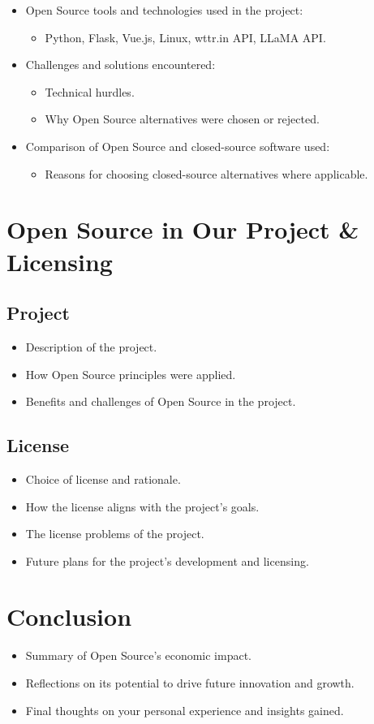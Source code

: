 \begin{itemize}
    \item Open Source tools and technologies used in the project:
    \begin{itemize}
        \item Python, Flask, Vue.js, Linux, wttr.in API, LLaMA API.
    \end{itemize}
    \item Challenges and solutions encountered:
    \begin{itemize}
        \item Technical hurdles.
        \item Why Open Source alternatives were chosen or rejected.
    \end{itemize}
    \item Comparison of Open Source and closed-source software used:
    \begin{itemize}
        \item Reasons for choosing closed-source alternatives where applicable.
    \end{itemize}
\end{itemize}

\section{Open Source in Our Project \& Licensing}
\subsection{Project}

\begin{itemize}
    \item Description of the project.
    \item How Open Source principles were applied.
    \item Benefits and challenges of Open Source in the project.
\end{itemize}
\subsection{License}

\begin{itemize}
    \item Choice of license and rationale.
    \item How the license aligns with the project’s goals.
    \item The license problems of the project.
    \item Future plans for the project’s development and licensing.
\end{itemize}

\section{Conclusion}

\begin{itemize}
    \item Summary of Open Source’s economic impact.
    \item Reflections on its potential to drive future innovation and growth.
    \item Final thoughts on your personal experience and insights gained.
\end{itemize}

